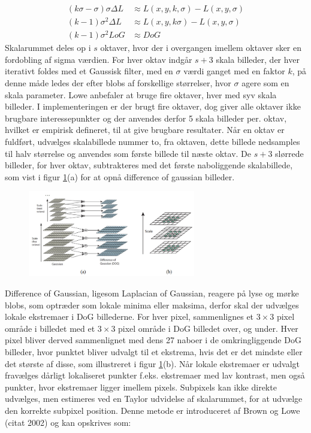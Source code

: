 \begin{equation}
\begin{split}
(k\sigma-\sigma)\sigma\Delta L &\approx L(x,y,k,\sigma)-L(x,y,\sigma) \\
(k-1)\sigma^2\Delta L &\approx L(x,y,k\sigma)-L(x,y,\sigma) \\
(k-1)\sigma^2LoG &\approx DoG
\end{split}
\end{equation}
Skalarummet deles op i $s$ oktaver, hvor der i overgangen imellem oktaver sker en fordobling af sigma værdien. For hver oktav indgår $s+3$ skala billeder, der hver iterativt foldes med et Gaussisk filter, med en $\sigma$ værdi ganget med en faktor $k$, på denne måde ledes der efter blobs af forskellige størrelser, hvor $\sigma$ agere som en skala parameter. Lowe anbefaler at bruge fire oktaver, hver med syv skala billeder. I implementeringen er der brugt fire oktaver, dog giver alle oktaver ikke brugbare interessepunkter og der anvendes derfor 5 skala billeder per. oktav, hvilket er empirisk defineret, til at give brugbare resultater. Når en oktav er fuldført, udvælges skalabillede nummer to, fra oktaven, dette billede nedsamples til halv størrelse og anvendes som første billede til næste oktav. De $s+3$ slørrede billeder, for hver oktav, subtrakteres med det første naboliggende skalabillede, som vist i figur \ref{fig:difference}(a) for at opnå difference of gaussian billeder.
\begin{figure}[H]
    \centering
    \includegraphics[width=0.65\textwidth]{fig/30.png}
     \vspace{-1em}
    \begin{center}    
       \caption{\textcolor{gray}{\footnotesize \textit{ }}}
    \label{fig:difference}
     \end{center}
     \vspace{-2.5em}
  \end{figure} \noindent
Difference of Gaussian, ligesom Laplacian of Gaussian, reagere på lyse og mørke blobs, som optræder som lokale minima eller maksima\cite{linden1}, derfor skal der udvælges lokale ekstremaer i DoG billederne. For hver pixel, sammenlignes et $3\times3$ pixel område i billedet med et $3\times3$ pixel område i DoG billedet over, og under. Hver pixel bliver derved sammenlignet med dens 27 naboer i de omkringliggende DoG billeder, hvor punktet bliver udvalgt til et ekstrema, hvis det er det mindste eller det største af disse, som illustreret i figur \ref{fig:difference}(b). Når lokale ekstremaer er udvalgt fravælges dårligt lokaliseret punkter f.eks. ekstremaer med lav kontrast, men også punkter, hvor ekstremaer ligger imellem pixels. Subpixels kan ikke direkte udvælges, men estimeres ved en Taylor udvidelse af skalarummet, for at udvælge den korrekte subpixel position. Denne metode er introduceret af Brown og Lowe (citat 2002) og kan opskrives som:
